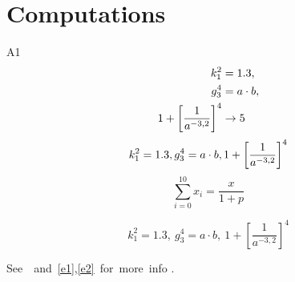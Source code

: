\chapter{Computations}\label{app:computations}
A1
\begin{align}
    \label{e1}
    k_1^2 &= 1.3, \\
    \label{e2} g_3^4 &= a \cdot b, \\
    \notag 1+\left[\frac{1}{a^{-3{,}2}}\right]^4 &\rightarrow 5
\end{align}
\label{start}
\lipsum[2]
$$k_1^2 = 1.3, \\
g_3^4 = a \cdot b, \\
1+\left[\frac{1}{a^{-3{,}2}}\right]^4$$
\lipsum[3]
$$
\sum_{i=0}^{10}x_i = \frac x {1+p}
$$
\lipsum[4]

\lipsum[5]
$$k_1^2 = 1.3, \
g_3^4 = a \cdot b, \
1+\left[\frac{1}{a^{-3{,}2}}\right]^4$$
\lipsum[6]

See~\pageref{start}~and~\eqref{e1},\eqref{e2}~for~more~info .

\lipsum[7-18]